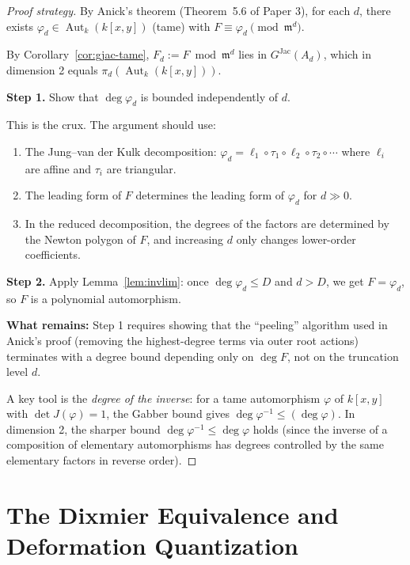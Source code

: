 \documentclass[12pt,a4paper]{article}
\theoremstyle{definition}
\newcommand{\kk}{k}
\newcommand{\pp}{\mathfrak{m}}
\newcommand{\Aut}{\operatorname{Aut}}
\newcommand{\GJac}{G^{\mathrm{Jac}}}
\begin{document}
\begin{proof}[Proof strategy]
By Anick's theorem (Theorem~5.6 of Paper 3), for each $d$, there exists
$\varphi_d \in \Aut_\kk(\kk[x,y])$ (tame) with $F \equiv \varphi_d \pmod{\pp^d}$.

By Corollary~\ref{cor:gjac-tame}, $F_d := F \bmod \pp^d$ lies in $\GJac(A_d)$,
which in dimension 2 equals $\pi_d(\Aut_\kk(\kk[x,y]))$.

\medskip
\textbf{Step 1.} Show that $\deg \varphi_d$ is bounded independently of $d$.

This is the crux. The argument should use:
\begin{enumerate}[label=(\alph*)]
\item The Jung--van der Kulk decomposition: $\varphi_d = \ell_1 \circ \tau_1 \circ
  \ell_2 \circ \tau_2 \circ \cdots$ where $\ell_i$ are affine and $\tau_i$ are triangular.
\item The leading form of $F$ determines the leading form of $\varphi_d$ for $d \gg 0$.
\item In the reduced decomposition, the degrees of the factors are determined by the
  Newton polygon of $F$, and increasing $d$ only changes lower-order coefficients.
\end{enumerate}

\textbf{Step 2.} Apply Lemma~\ref{lem:invlim}: once $\deg \varphi_d \leq D$ and
$d > D$, we get $F = \varphi_d$, so $F$ is a polynomial automorphism.

\medskip
\textbf{What remains:} Step 1 requires showing that the ``peeling'' algorithm used in
Anick's proof (removing the highest-degree terms via outer root actions) terminates with
a degree bound depending only on $\deg F$, not on the truncation level $d$.

A key tool is the \emph{degree of the inverse}: for a tame automorphism $\varphi$ of
$\kk[x,y]$ with $\det J(\varphi) = 1$, the Gabber bound gives
$\deg \varphi^{-1} \leq (\deg \varphi)$. In dimension 2, the sharper bound
$\deg \varphi^{-1} \leq \deg \varphi$ holds (since the inverse of a composition of
elementary automorphisms has degrees controlled by the same elementary factors in
reverse order).
\end{proof}

\section{The Dixmier Equivalence and Deformation Quantization}
\end{document}
